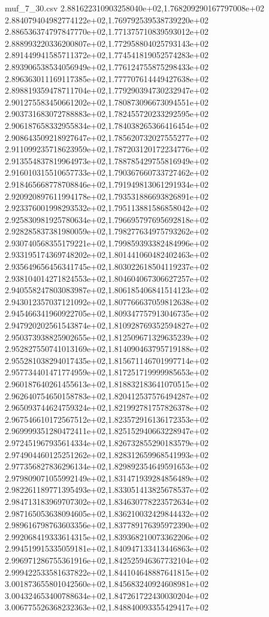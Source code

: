 \begin{filecontents*}{muf_7_30.csv}
2.881622310903258040e+02,1.768209290167797008e+02
2.884079404982774122e+02,1.769792539538739220e+02
2.886536374797847770e+02,1.771375710839593012e+02
2.888993220336200807e+02,1.772958804025793143e+02
2.891449941585711372e+02,1.774541819052574283e+02
2.893906538534056949e+02,1.776124755875298433e+02
2.896363011169117385e+02,1.777707614449427638e+02
2.898819359478711704e+02,1.779290394730232947e+02
2.901275583450661202e+02,1.780873096673094551e+02
2.903731683072788883e+02,1.782455720233292595e+02
2.906187658332955834e+02,1.784038265366416454e+02
2.908643509218927647e+02,1.785620732027555277e+02
2.911099235718623959e+02,1.787203120172234776e+02
2.913554837819964973e+02,1.788785429755816949e+02
2.916010315510657733e+02,1.790367660733727462e+02
2.918465668778708846e+02,1.791949813061291934e+02
2.920920897611994178e+02,1.793531886693826891e+02
2.923376001998293532e+02,1.795113881586858042e+02
2.925830981925780634e+02,1.796695797695692818e+02
2.928285837381980059e+02,1.798277634975793262e+02
2.930740568355179221e+02,1.799859393382484996e+02
2.933195174369748202e+02,1.801441060482402463e+02
2.935649656456341745e+02,1.803022618504119237e+02
2.938104014271824553e+02,1.804604067306627257e+02
2.940558247803083987e+02,1.806185406841514123e+02
2.943012357037121092e+02,1.807766637059812638e+02
2.945466341960922705e+02,1.809347757913046735e+02
2.947920202561543874e+02,1.810928769352594827e+02
2.950373938825902655e+02,1.812509671329635239e+02
2.952827550741013169e+02,1.814090463795719188e+02
2.955281038294017435e+02,1.815671146701997714e+02
2.957734401471774959e+02,1.817251719999985653e+02
2.960187640261455613e+02,1.818832183641070515e+02
2.962640754650158783e+02,1.820412537576494287e+02
2.965093744624759324e+02,1.821992781757826378e+02
2.967546610172567512e+02,1.823572916136172353e+02
2.969999351280472411e+02,1.825152940663228947e+02
2.972451967935614334e+02,1.826732855290183579e+02
2.974904460125251262e+02,1.828312659968541993e+02
2.977356827836296134e+02,1.829892354649591653e+02
2.979809071055992149e+02,1.831471939284856489e+02
2.982261189771395493e+02,1.833051413825678537e+02
2.984713183969707302e+02,1.834630778223572634e+02
2.987165053638094605e+02,1.836210032429844432e+02
2.989616798763603356e+02,1.837789176395972390e+02
2.992068419333614315e+02,1.839368210073362206e+02
2.994519915335059181e+02,1.840947133413446863e+02
2.996971286755361916e+02,1.842525946367732104e+02
2.999422533581637822e+02,1.844104648887641815e+02
3.001873655801042560e+02,1.845683240924608981e+02
3.004324653400788634e+02,1.847261722430030204e+02
3.006775526368232363e+02,1.848840093355429417e+02

\end{filecontents*}
